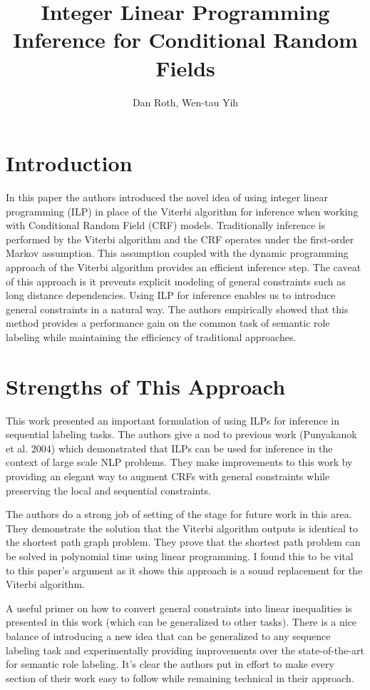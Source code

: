 \documentclass[fleqn,11pt]{wlpeerj} %
\title{Integer Linear Programming Inference for Conditional Random Fields}
\author[]{Dan Roth, Wen-tau Yih}
\affil[]{Department of Computer Science, University of Illinois at Urbana-Champaign, Urbana, IL 61801 USA}
\begin{document}
\flushbottom
\maketitle
\thispagestyle{empty}

\section*{Introduction}

In this paper the authors introduced the novel idea of using integer linear programming (ILP) in place of the Viterbi algorithm for inference when working with Conditional Random Field (CRF) models. Traditionally inference is performed by the Viterbi algorithm and the CRF operates under the first-order Markov assumption. This assumption coupled with the dynamic programming approach of the Viterbi algorithm provides an efficient inference step. The caveat of this approach is it prevents explicit modeling of general constraints such as long distance dependencies. Using ILP for inference enables us to introduce general constraints in a natural way. The authors empirically showed that this method provides a performance gain on the common task of semantic role labeling while maintaining the efficiency of traditional approaches.

\section*{Strengths of This Approach}

This work presented an important formulation of using ILPs for inference in sequential labeling tasks. The authors give a nod to previous work (Punyakanok et al. 2004) which demonstrated that ILPs can be used for inference in the context of large scale NLP problems. They make improvements to this work by providing an elegant way to augment CRFs with general constraints while preserving the local and sequential constraints.

The authors do a strong job of setting of the stage for future work in this area. They demonstrate the solution that the Viterbi algorithm outputs is identical to the shortest path graph problem. They prove that the shortest path problem can be solved in polynomial time using linear programming. I found this to be vital to this paper's argument as it shows this approach is a sound replacement for the Viterbi algorithm.

A useful primer on how to convert general constraints into linear inequalities is presented in this work (which can be generalized to other tasks). There is a nice balance of introducing a new idea that can be generalized to any sequence labeling task and experimentally providing improvements over the state-of-the-art for semantic role labeling. It's clear the authors put in effort to make every section of their work easy to follow while remaining technical in their approach.
\end{document}
